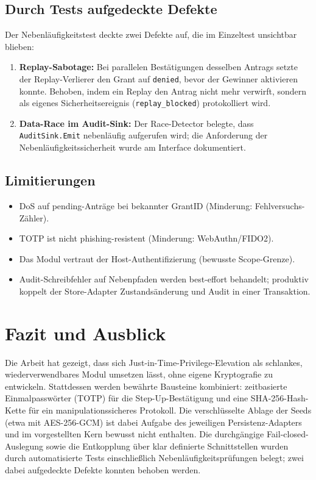 \documentclass[11pt,a4paper]{article}
\begin{document}
\subsection{Durch Tests aufgedeckte Defekte}
Der Nebenläufigkeitstest deckte zwei Defekte auf, die im Einzeltest unsichtbar
blieben:
\begin{enumerate}
  \item \textbf{Replay-Sabotage:} Bei parallelen Bestätigungen desselben
        Antrags setzte der Replay-Verlierer den Grant auf \texttt{denied},
        bevor der Gewinner aktivieren konnte. Behoben, indem ein Replay den
        Antrag nicht mehr verwirft, sondern als eigenes Sicherheitsereignis
        (\texttt{replay\_blocked}) protokolliert wird.
  \item \textbf{Data-Race im Audit-Sink:} Der Race-Detector belegte, dass
        \texttt{AuditSink.Emit} nebenläufig aufgerufen wird; die Anforderung
        der Nebenläufigkeitssicherheit wurde am Interface dokumentiert.
\end{enumerate}

\subsection{Limitierungen}
\begin{itemize}
  \item DoS auf pending-Anträge bei bekannter GrantID (Minderung:
        Fehlversuchs-Zähler).
  \item TOTP ist nicht phishing-resistent (Minderung: WebAuthn/FIDO2).
  \item Das Modul vertraut der Host-Authentifizierung (bewusste Scope-Grenze).
  \item Audit-Schreibfehler auf Nebenpfaden werden best-effort behandelt;
        produktiv koppelt der Store-Adapter Zustandsänderung und Audit in einer
        Transaktion.
\end{itemize}

\section{Fazit und Ausblick}

Die Arbeit hat gezeigt, dass sich Just-in-Time-Privilege-Elevation als
schlankes, wiederverwendbares Modul umsetzen lässt, ohne eigene Kryptografie zu
entwickeln. Stattdessen werden bewährte Bausteine kombiniert: zeitbasierte
Einmalpasswörter (TOTP) für die Step-Up-Bestätigung und eine
SHA-256-Hash-Kette für ein manipulationssicheres Protokoll. Die verschlüsselte
Ablage der Seeds (etwa mit AES-256-GCM) ist dabei Aufgabe des jeweiligen
Persistenz-Adapters und im vorgestellten Kern bewusst nicht enthalten. Die durchgängige Fail-closed-Auslegung sowie
die Entkopplung über klar definierte Schnittstellen wurden durch automatisierte
Tests einschließlich Nebenläufigkeitsprüfungen belegt; zwei dabei aufgedeckte
Defekte konnten behoben werden.
\end{document}
